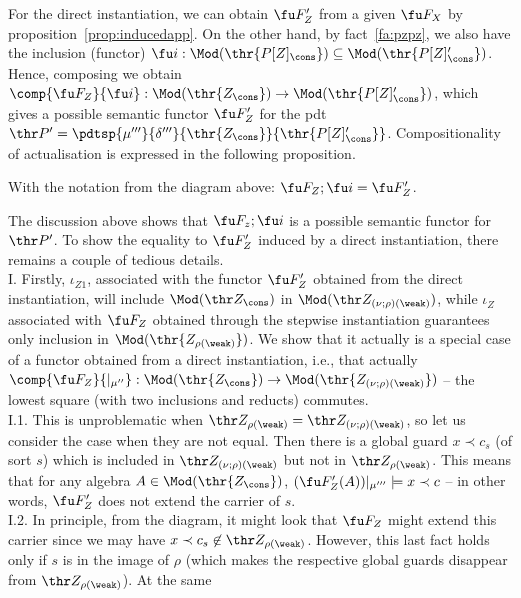 For the direct instantiation, we can obtain $\fu F'_Z$ from a given $\fu
F_X$ by proposition~\ref{prop:inducedapp}. On the other hand,
by fact~\ref{fa:pzpz}, we also have the inclusion (functor) 
$\fu i:\Mod(\thr{P[Z]_\cons})\subseteq\Mod(\thr{P[Z]'_\cons})$.  
Hence, composing we obtain $\comp{\fu
F_Z}{\fu i}:\Mod(\thr{Z_\cons})\to\Mod(\thr{P[Z]'_\cons})$, which gives a
possible semantic functor $\fu F'_Z$ for the pdt
$\thr P'=\pdtsp{\mu'''}{\delta'''}{\thr{Z_\cons}}{\thr{P[Z]'_\cons}}$. 
Compositionality of actualisation is expressed in the following proposition.
%
\begin{proposition}
With the notation from the diagram above: $\fu F_Z;\fu i = \fu F'_Z$.
\end{proposition}
\begin{PROOF}
The discussion above shows that $\fu F_z;\fu i$ is a possible semantic
functor for $\thr P'$. To show the equality to $\fu F'_Z$ induced by a direct
instantiation, there remains a couple of tedious  details. 
\\[1ex]
I. Firstly, $\iota_{Z1}$, associated with the functor $\fu F'_Z$ obtained from the direct
instantiation, will include $\Mod(\thr Z_\cons)$ 
in $\Mod(\thr Z_{(\nu;\rho)(\weak)})$, while $\iota_Z$ associated with $\fu
F_Z$ obtained through the stepwise instantiation guarantees only inclusion in
$\Mod(\thr{Z_{\rho(\weak)}})$. 
We show that it actually is a special case
of a functor obtained from a direct instantiation, i.e., that actually $\comp{\fu
F_Z}{|_{\mu''}}:\Mod(\thr{Z_\cons})\to \Mod(\thr{Z_{(\nu;\rho)(\weak)}})$ --
the lowest square (with two inclusions and reducts) commutes.
\\[1ex]
I.1. This is unproblematic when $\thr Z_{\rho(\weak)}=\thr Z_{(\nu;\rho)(\weak)}$,
so let us consider the case when they are not equal. Then there is a global
guard $x\prec c_s$ (of sort $s$) which is included in $\thr Z_{(\nu;\rho)(\weak)}$ but not in
$\thr Z_{\rho(\weak)}$. This means that for any algebra
$A\in\Mod(\thr{Z_\cons})$, $(\fu F'_Z(A))|_{\mu'''}\models x\prec c$ -- in
other words, $\fu F'_Z$ does not extend the carrier of $s$. 
\\[1ex]
I.2. In principle,
from the diagram, it might look that $\fu F_Z$ might extend this carrier
since we may have $x\prec c_s \not\in \thr Z_{\rho(\weak)}$. However, this
last fact holds only if $s$ is in the image of $\rho$ (which makes the
respective global guards disappear from $\thr Z_{\rho(\weak)}$). At the same

\end{PROOF}
